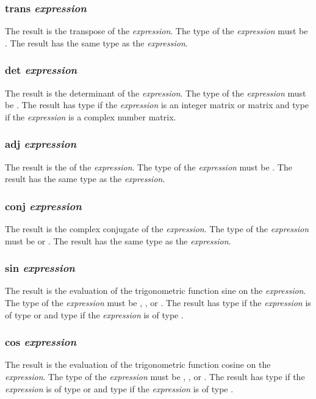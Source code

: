 \subsubsection{trans \textit{expression}}
The result is the transpose of the \textit{expression}. The type of the \textit{expression} must be \mat. The result has the same type as the \textit{expression}.
\subsubsection{det \textit{expression}}
The result is the determinant of the \textit{expression}. The type of the \textit{expression} must be \mat. The result has type \float if the \textit{expression} is an integer matrix or \float matrix and type \complex if the \textit{expression} is a complex number matrix.
\subsubsection{adj \textit{expression}}
The result is the  of the \textit{expression}. The type of the \textit{expression} must be \mat. The result has the same type as the \textit{expression}.
\subsubsection{conj \textit{expression}}
The result is the complex conjugate of the \textit{expression}. The type of the \textit{expression} must be \complex or \mat. The result has the same type as the \textit{expression}.
\subsubsection{sin \textit{expression}}
The result is the evaluation of the trigonometric function sine on the \textit{expression}. The type of the \textit{expression} must be \integ, \float, or  \complex. The result has type \float if the \textit{expression} is of type \integ or \float and type \complex if the \textit{expression} is of type  \complex.
\subsubsection{cos \textit{expression}}
The result is the evaluation of the trigonometric function cosine on the \textit{expression}. The type of the \textit{expression} must be \integ, \float, or  \complex. The result has type \float if the \textit{expression} is of type \integ or \float and type \complex if the \textit{expression} is of type  \complex.
